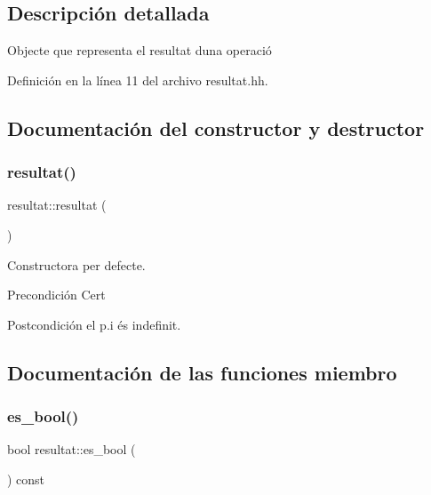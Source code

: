 \subsection{Descripción detallada}
Objecte que representa el resultat d\textquotesingle{}una operació 

Definición en la línea 11 del archivo resultat.\+hh.



\subsection{Documentación del constructor y destructor}
\hypertarget{classresultat_a536c47bd86857e3f5bfb26e156cb1877}{}\label{classresultat_a536c47bd86857e3f5bfb26e156cb1877} 
\subsubsection{\texorpdfstring{resultat()}{resultat()}}
{\footnotesize\ttfamily resultat\+::resultat (\begin{DoxyParamCaption}{ }\end{DoxyParamCaption})}



Constructora per defecte. 

\begin{DoxyPrecond}{Precondición}
Cert 
\end{DoxyPrecond}
\begin{DoxyPostcond}{Postcondición}
el p.\+i és indefinit. 
\end{DoxyPostcond}


\subsection{Documentación de las funciones miembro}
\hypertarget{classresultat_a3ed548d73663ca956ac2f087c400abe6}{}\label{classresultat_a3ed548d73663ca956ac2f087c400abe6} 
\subsubsection{\texorpdfstring{es\+\_\+bool()}{es\_bool()}}
{\footnotesize\ttfamily bool resultat\+::es\+\_\+bool (\begin{DoxyParamCaption}{ }\end{DoxyParamCaption}) const}



